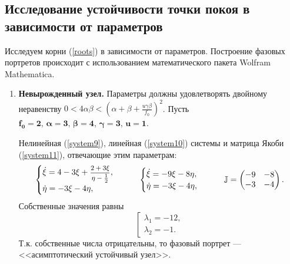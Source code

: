\documentclass[12pt, a4paper]{article}
\begin{document}
	\subsection{Исследование устойчивости точки покоя в зависимости от параметров}
	Исследуем корни (\ref{roots}) в зависимости от параметров. Построение фазовых портретов происходит с использованием математического пакета Wolfram Mathematica.
	\begin{enumerate}
	\item  \textbf{Невырожденный узел.} Параметры должны удовлетворять двойному неравенству $0<4\alpha\beta<(\alpha+\beta+\frac{u\gamma\beta}{f_0})^2$. Пусть $\boldsymbol{f_0=2,\,\alpha=3,\,\beta=4,\,\gamma=3,\,u=1}$.
	
	Нелинейная (\ref{system9}), линейная (\ref{system10}) системы и матрица Якоби (\ref{system11}), отвечающие этим параметрам:
	\begin{gather*}
\begin{cases}
	\dot \xi=4-3\xi+\hbox{\footnotesize$\displaystyle\frac{2+3\xi}{\eta-\frac{1}{2}}$},\\
	\dot \eta=-3\xi -4\eta,
\end{cases}
\qquad
\begin{cases}
	\dot\xi=-9\xi-8\eta,\\
	\dot \eta=-3\xi -4\eta,
\end{cases}
\qquad
\mathbb{J}=\begin{pmatrix}
	-9 & -8 \\
	-3 & -4
\end{pmatrix}.
	\end{gather*}
Собственные значения равны
\[
\left[
\begin{array}{l}
	\lambda_1=-12, \\
	\lambda_2=-1.
\end{array}
\right.
\]
Т.к. собственные числа отрицательны, то фазовый портрет --- <<асимптотический устойчивый узел>>.


\end{enumerate}
\end{document}
